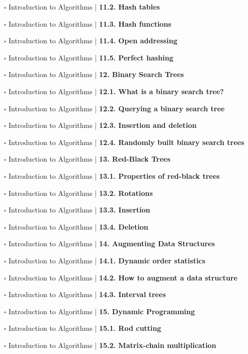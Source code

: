 \documentclass[a4, landscape, 12pt]{article}
\newcommand{\checkbox}{$\square$}%
\begin{document}
\begin{itemize}
{}
\item [\checkbox]  Introduction to Algorithms | \textbf{ 11.2. Hash tables
}
\item [\checkbox]  Introduction to Algorithms | \textbf{ 11.3. Hash functions
}
\item [\checkbox]  Introduction to Algorithms | \textbf{ 11.4. Open addressing
}
\item [\checkbox]  Introduction to Algorithms | \textbf{ 11.5. Perfect hashing
}
\item [\checkbox]  Introduction to Algorithms | \textbf{ 12. Binary Search Trees
}
\item [\checkbox]  Introduction to Algorithms | \textbf{ 12.1. What is a binary search tree?
}
\item [\checkbox]  Introduction to Algorithms | \textbf{ 12.2. Querying a binary search tree
}
\item [\checkbox]  Introduction to Algorithms | \textbf{ 12.3. Insertion and deletion
}
\item [\checkbox]  Introduction to Algorithms | \textbf{ 12.4. Randomly built binary search trees
}
\item [\checkbox]  Introduction to Algorithms | \textbf{ 13. Red-Black Trees
}
\item [\checkbox]  Introduction to Algorithms | \textbf{ 13.1. Properties of red-black trees
}
\item [\checkbox]  Introduction to Algorithms | \textbf{ 13.2. Rotations
}
\item [\checkbox]  Introduction to Algorithms | \textbf{ 13.3. Insertion
}
\item [\checkbox]  Introduction to Algorithms | \textbf{ 13.4. Deletion
}
\item [\checkbox]  Introduction to Algorithms | \textbf{ 14. Augmenting Data Structures
}
\item [\checkbox]  Introduction to Algorithms | \textbf{ 14.1. Dynamic order statistics
}
\item [\checkbox]  Introduction to Algorithms | \textbf{ 14.2. How to augment a data structure
}
\item [\checkbox]  Introduction to Algorithms | \textbf{ 14.3. Interval trees
}
\item [\checkbox]  Introduction to Algorithms | \textbf{ 15. Dynamic Programming
}
\item [\checkbox]  Introduction to Algorithms | \textbf{ 15.1. Rod cutting
}
\item [\checkbox]  Introduction to Algorithms | \textbf{ 15.2. Matrix-chain multiplication
}
\end{itemize}
\end{document}
